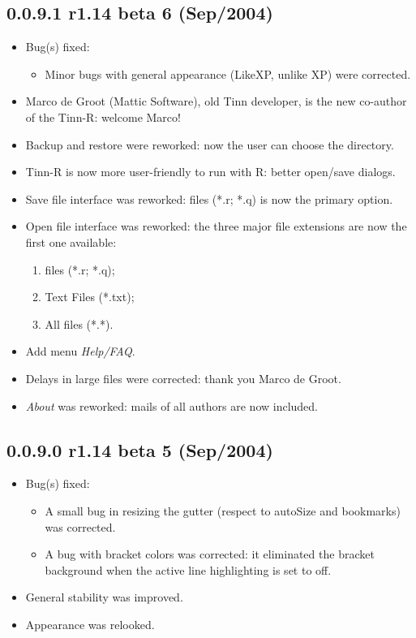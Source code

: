 \subsection*{0.0.9.1 r1.14 beta 6 (Sep/2004)}
\begin{itemize}
  \item Bug(s) fixed:
    \begin{itemize}
      \item Minor bugs with general appearance (LikeXP, unlike XP) were corrected.
    \end{itemize}
  \item Marco de Groot (Mattic Software), old Tinn developer, is the new co-author of the Tinn-R: welcome Marco!
  \item Backup and restore were reworked: now the user can choose the directory.
  \item Tinn-R is now more user-friendly to run with R: better \RR{} open/save dialogs.
  \item Save file interface was reworked: \RR{} files (*.r; *.q) is now the primary option.
  \item Open file interface was reworked: the three major file extensions are now the first one available:
    \begin{enumerate}
      \item \RR{} files (*.r; *.q);
      \item Text Files (*.txt);
      \item All files (*.*).
    \end{enumerate}
  \item Add menu \textit{Help/FAQ}.
  \item Delays in large files were corrected: thank you Marco de Groot.
  \item \textit{About} was reworked: mails of all authors are now included.
\end{itemize}


\subsection*{0.0.9.0 r1.14 beta 5 (Sep/2004)}
\begin{itemize}
  \item Bug(s) fixed:
    \begin{itemize}
      \item A small bug in resizing the gutter (respect to autoSize and bookmarks) was corrected.
      \item A bug with bracket colors was corrected: it eliminated the bracket background when
        the active line highlighting is set to off.
    \end{itemize}
  \item General stability was improved.
  \item Appearance was relooked.
\end{itemize}


